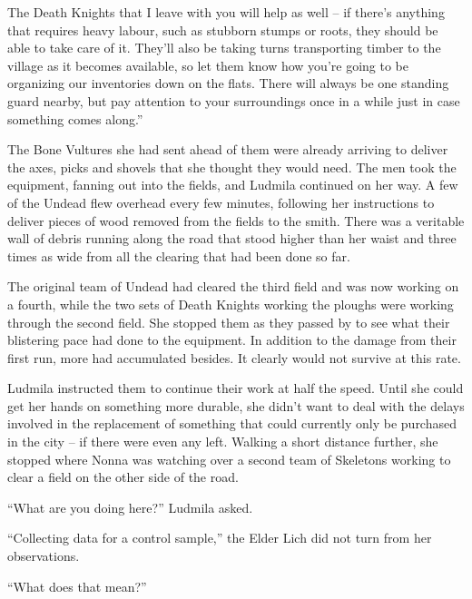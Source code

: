  

The Death Knights that I leave with you will help as well – if there’s anything that requires heavy labour, such as stubborn stumps or roots, they should be able to take care of it. They’ll also be taking turns transporting timber to the village as it becomes available, so let them know how you’re going to be organizing our inventories down on the flats. There will always be one standing guard nearby, but pay attention to your surroundings once in a while just in case something comes along.”

 

The Bone Vultures she had sent ahead of them were already arriving to deliver the axes, picks and shovels that she thought they would need. The men took the equipment, fanning out into the fields, and Ludmila continued on her way. A few of the Undead flew overhead every few minutes, following her instructions to deliver pieces of wood removed from the fields to the smith. There was a veritable wall of debris running along the road that stood higher than her waist and three times as wide from all the clearing that had been done so far.

 

The original team of Undead had cleared the third field and was now working on a fourth, while the two sets of Death Knights working the ploughs were working through the second field. She stopped them as they passed by to see what their blistering pace had done to the equipment. In addition to the damage from their first run, more had accumulated besides. It clearly would not survive at this rate.

 

Ludmila instructed them to continue their work at half the speed. Until she could get her hands on something more durable, she didn’t want to deal with the delays involved in the replacement of something that could currently only be purchased in the city – if there were even any left. Walking a short distance further, she stopped where Nonna was watching over a second team of Skeletons working to clear a field on the other side of the road.

 

“What are you doing here?” Ludmila asked.

 

“Collecting data for a control sample,” the Elder Lich did not turn from her observations.

 

“What does that mean?”

